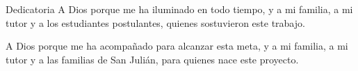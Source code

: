 \begin{estilodedicatoria}{Dedicatoria}
A Dios porque me ha iluminado en todo tiempo, y a mi familia, a mi tutor y a los estudiantes postulantes, quienes sostuvieron este trabajo.
\hfill\textbf{\autoruno}

\bigskip

A Dios porque me ha acompañado para alcanzar esta meta, y a mi familia, a mi tutor y a las familias de San Julián, para quienes nace este proyecto.
\hfill\textbf{\autordos}
\end{estilodedicatoria}
